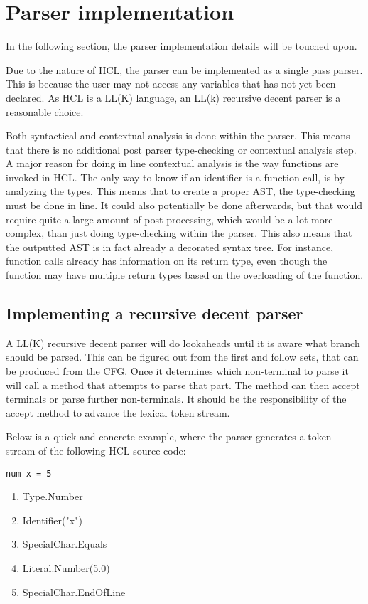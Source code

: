 \section{Parser implementation}
\label{parserImplemention}
In the following section, the parser implementation details will be touched upon.

Due to the nature of HCL, the parser can be implemented as a single pass parser. 
This is because the user may not access any variables that has not yet been declared. 
As HCL is a LL(K) language, an LL(k) recursive decent parser is a reasonable choice.

Both syntactical and contextual analysis is done within the parser. 
This means that there is no additional post parser type-checking or contextual analysis step. 
A major reason for doing in line contextual analysis is the way functions are invoked in HCL. 
The only way to know if an identifier is a function call, is by analyzing the types. 
This means that to create a proper AST, the type-checking must be done in line. 
It could also potentially be done afterwards, but that would require quite a large amount of post processing, which would be a lot more complex, than just doing type-checking within the parser. 
This also means that the outputted AST is in fact already a decorated syntax tree. 
For instance, function calls already has information on its return type, even though the function may have multiple return types based on the overloading of the function.

\subsection{Implementing a recursive decent parser}
A LL(K) recursive decent parser will do lookaheads until it is aware what branch should be parsed.
This can be figured out from the first and follow sets, that can be produced from the CFG.
Once it determines which non-terminal to parse it will call a method that attempts to parse that part.
The method can then accept terminals or parse further non-terminals.
It should be the responsibility of the accept method to advance the lexical token stream.

Below is a quick and concrete example, where the parser generates a token stream of the following HCL source code:
\begin{lstlisting}[language=HCL,label=lis:typedcls,firstnumber=1]
num x = 5
\end{lstlisting}

\begin{enumerate}
	\item Type.Number
	\item Identifier("x")
	\item SpecialChar.Equals
	\item Literal.Number(5.0)
	\item SpecialChar.EndOfLine
\end{enumerate}

